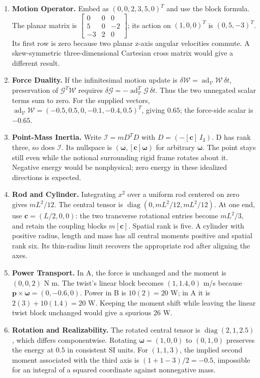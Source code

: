 \begin{enumerate}
\item \textbf{Motion Operator.} Embed as $(0,0,2,3,5,0)^T$ and use the block formula. The planar matrix is $\left[\begin{smallmatrix}0&0&0\\5&0&-2\\-3&2&0\end{smallmatrix}\right]$; its action on $(1,0,0)^T$ is $(0,5,-3)^T$. Its first row is zero because two planar z-axis angular velocities commute. A skew-symmetric three-dimensional Cartesian cross matrix would give a different result.
\item \textbf{Force Duality.} If the infinitesimal motion update is $\delta\mathcal W=\operatorname{ad}_{\mathcal V}\mathcal W\,\delta t$, preservation of $\mathcal G^T\mathcal W$ requires $\delta\mathcal G=-\operatorname{ad}_{\mathcal V}^T\mathcal G\,\delta t$. Thus the two unnegated scalar terms sum to zero. For the supplied vectors, $\operatorname{ad}_{\mathcal V}\mathcal W=(-0.5,0.5,0,-0.1,-0.4,0.5)^T$, giving $0.65$; the force-side scalar is $-0.65$.
\item \textbf{Point-Mass Inertia.} Write $\mathcal I=mD^TD$ with $D=(-[\mathbf c]\ I_3)$. D has rank three, so does $\mathcal I$. Its nullspace is $(\boldsymbol\omega,[\mathbf c]\boldsymbol\omega)$ for arbitrary $\boldsymbol\omega$. The point stays still even while the notional surrounding rigid frame rotates about it. Negative energy would be nonphysical; zero energy in these idealized directions is expected.
\item \textbf{Rod and Cylinder.} Integrating $x^2$ over a uniform rod centered on zero gives $mL^2/12$. The central tensor is $\operatorname{diag}(0,mL^2/12,mL^2/12)$. At one end, use $\mathbf c=(L/2,0,0)$: the two transverse rotational entries become $mL^2/3$, and retain the coupling blocks $m[\mathbf c]$. Spatial rank is five. A cylinder with positive radius, length and mass has all central moments positive and spatial rank six. Its thin-radius limit recovers the appropriate rod after aligning the axes.
\item \textbf{Power Transport.} In A, the force is unchanged and the moment is $(0,0,2)$ N m. The twist's linear block becomes $(1,1.4,0)$ m/s because $\mathbf p\times\boldsymbol\omega=(0,-0.6,0)$. Power in B is $10(2)=20$ W; in A it is $2(3)+10(1.4)=20$ W. Keeping the moment shift while leaving the linear twist block unchanged would give a spurious 26 W.
\item \textbf{Rotation and Realizability.} The rotated central tensor is $\operatorname{diag}(2,1,2.5)$, which differs componentwise. Rotating $\boldsymbol\omega=(1,0,0)$ to $(0,1,0)$ preserves the energy at $0.5$ in consistent SI units. For $(1,1,3)$, the implied second moment associated with the third axis is $(1+1-3)/2=-0.5$, impossible for an integral of a squared coordinate against nonnegative mass.

\end{enumerate}
